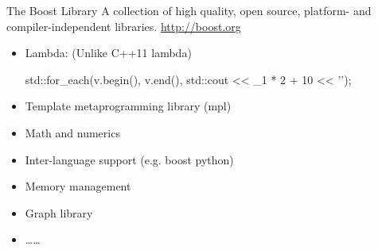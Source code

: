 \begin{frame}[fragile]{The Boost Library}
    A collection of high quality, open source, platform- and compiler-independent libraries. \url{http://boost.org}
    \begin{itemize}
        \item Lambda: (Unlike C++11 lambda)
        \begin{cpp}
std::for_each(v.begin(), v.end(),
            std::cout << _1 * 2 + 10 << '\n');
        \end{cpp}
        \item Template metaprogramming library (mpl)
        \item Math and numerics
        \item Inter-language support (e.g. boost python)
        \item Memory management
        \item Graph library
        \item \dots\dots
    \end{itemize}
\end{frame}
